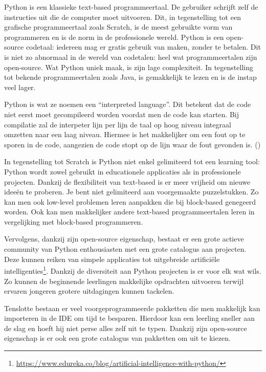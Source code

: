 Python is een klassieke text-based programmeertaal. De gebruiker schrijft zelf de instructies uit die de computer moet uitvoeren. Dit, in tegenstelling tot een grafische programmeertaal zoals Scratch, is de meest gebruikte vorm van programmeren en is de norm in de professionele wereld. Python is een open-source codetaal: iedereen mag er gratis gebruik van maken, zonder te betalen. Dit is niet zo abnormaal in de wereld van codetalen: heel wat programmeertalen zijn open-source. Wat Python uniek maak, is zijn lage complexiteit. In tegenstelling tot bekende programmeertalen zoals Java, is gemakkelijk te lezen en is de instap veel lager. 


Python is wat ze noemen een “interpreted language”. Dit betekent dat de code niet eerst moet gecompileerd worden voordat men de code kan starten. Bij compilatie zal de interpeter lijn per lijn de taal op hoog niveau integraal omzetten naar een laag niveau. Hiermee is het makkelijker om een fout op te sporen in de code, aangezien de code stopt op de lijn waar de fout gevonden is. (\cite{Karani2020})

In tegenstelling tot Scratch is Python niet enkel gelimiteerd tot een learning tool: Python wordt zowel gebruikt in educationele applicaties als in professionele projecten. Dankzij de flexibiliteit van text-based is er meer vrijheid om nieuwe ideeën te proberen. Je bent niet gelimiteerd aan voorgemaakte puzzelstukken. Zo kan men ook low-level problemen leren aanpakken die bij block-based genegeerd worden. Ook kan men makkelijker andere text-based programmeertalen leren in vergelijking met block-based programmeren.

Vervolgens, dankzij zijn open-source eigenschap, bestaat er een grote actieve community van Python enthousiasten met een grote catalogus aan projecten. Deze kunnen reiken van simpele applicaties tot uitgebreide artificiële intelligenties\footnote{\url{https://www.edureka.co/blog/artificial-intelligence-with-python/}}. Dankzij de diversiteit aan Python projecten is er voor elk wat wils. Zo kunnen de beginnende leerlingen makkelijke opdrachten uitvoeren terwijl ervaren jongeren grotere uitdagingen kunnen tackelen. 

Tenslotte bestaan er veel voorgeprogrammeerde pakketten die men makkelijk kan importeren in de IDE om tijd te besparen. Hierdoor kan een leerling sneller aan de slag en hoeft hij niet perse alles zelf uit te typen. Dankzij zijn open-source eigenschap is er ook een grote catalogus van pakketten om uit te kiezen.

